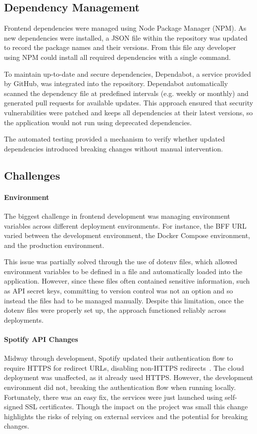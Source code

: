 \subsection{Dependency Management}
Frontend dependencies were managed using Node Package Manager (NPM). As new dependencies were installed, a JSON file within the repository was updated to record the package names and their versions. From this file any developer using NPM could install all required dependencies with a single command.

To maintain up-to-date and secure dependencies, Dependabot, a service provided by GitHub, was integrated into the repository. Dependabot automatically scanned the dependency file at predefined intervals (e.g. weekly or monthly) and generated pull requests for available updates. This approach ensured that security vulnerabilities were patched and keeps all dependencies at their latest versions, so the application would not run using deprecated dependencies.

The automated testing provided a mechanism to verify whether updated dependencies introduced breaking changes without manual intervention.

\subsection{Challenges}
\paragraph{Environment}
The biggest challenge in frontend development was managing environment variables across different deployment environments. For instance, the BFF URL varied between the development environment, the Docker Compose environment, and the production environment.

This issue was partially solved through the use of dotenv files, which allowed environment variables to be defined in a file and automatically loaded into the application. However, since these files often contained sensitive information, such as API secret keys, committing to version control was not an option and so instead the files had to be managed manually. Despite this limitation, once the dotenv files were properly set up, the approach functioned reliably across deployments.

\paragraph{Spotify API Changes}
Midway through development, Spotify updated their authentication flow to require HTTPS for redirect URLs, disabling non-HTTPS redirects~\cite{spotifyredirects}. The cloud deployment was unaffected, as it already used HTTPS. However, the development environment did not, breaking the authentication flow when running locally. Fortunately, there was an easy fix, the services were just launched using self-signed SSL certificates. Though the impact on the project was small this change highlights the risks of relying on external services and the potential for breaking changes.

